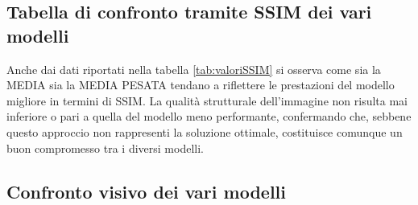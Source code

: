 \subsection{Tabella di confronto tramite SSIM dei vari modelli}
\begin{table}[H] %
    \centering
    \caption{Confronto dei modelli di despeckling e della loro fusione. 
              I valori sopra, indicano la media del SSIM di 100 immagini rappresentanti diversi biomi.
              Ogni modello per la previsione della qualità, usato in MEDIA PESATA, 
              è stato allenato per 10 epoche con un dataset da 30'000 
              immagini. }
    \label{tab:valoriSSIM}
  \end{table}  
  Anche dai dati riportati nella tabella \ref{tab:valoriSSIM} si osserva come sia la MEDIA sia la MEDIA PESATA 
  tendano a riflettere le prestazioni del modello migliore in termini di SSIM. La qualità strutturale dell’immagine 
  non risulta mai inferiore o pari a quella del modello meno performante, confermando che, sebbene questo 
  approccio non rappresenti la soluzione ottimale, costituisce comunque un buon compromesso tra i diversi modelli.
  \subsection{Confronto visivo dei vari modelli}

